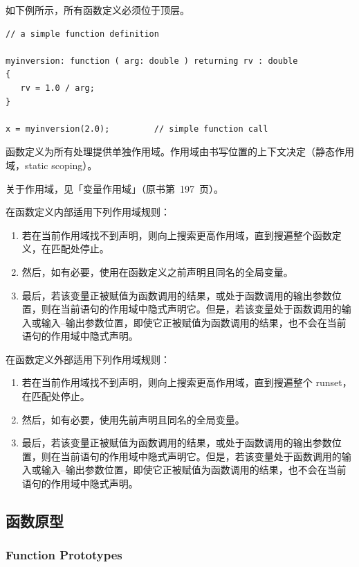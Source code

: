 如下例所示，所有函数定义必须位于顶层。
\begin{lstlisting}[style=pxl]
// a simple function definition

myinversion: function ( arg: double ) returning rv : double
{
   rv = 1.0 / arg;
}

x = myinversion(2.0);         // simple function call
\end{lstlisting}

函数定义为所有处理提供单独作用域。作用域由书写位置的上下文决定（静态作用域，static scoping）。

\begin{seeAlsoBox}
关于作用域，见「变量作用域」（原书第~197~页）。
\end{seeAlsoBox}

在函数定义内部适用下列作用域规则：
\begin{enumerate}
  \item 若在当前作用域找不到声明，则向上搜索更高作用域，直到搜遍整个函数定义，在匹配处停止。
  \item 然后，如有必要，使用在函数定义之前声明且同名的全局变量。
  \item 最后，若该变量正被赋值为函数调用的结果，或处于函数调用的输出参数位置，则在当前语句的作用域中隐式声明它。但是，若该变量处于函数调用的输入或输入--输出参数位置，即使它正被赋值为函数调用的结果，也不会在当前语句的作用域中隐式声明。
\end{enumerate}

在函数定义外部适用下列作用域规则：
\begin{enumerate}
  \item 若在当前作用域找不到声明，则向上搜索更高作用域，直到搜遍整个 runset，在匹配处停止。
  \item 然后，如有必要，使用先前声明且同名的全局变量。
  \item 最后，若该变量正被赋值为函数调用的结果，或处于函数调用的输出参数位置，则在当前语句的作用域中隐式声明它。但是，若该变量处于函数调用的输入或输入--输出参数位置，即使它正被赋值为函数调用的结果，也不会在当前语句的作用域中隐式声明。
\end{enumerate}

\subsection{函数原型}
\subsubsection*{Function Prototypes}

